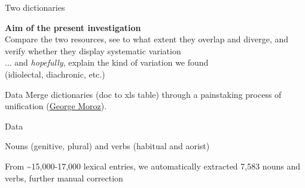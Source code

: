 \begin{frame}{Two dictionaries}

\begin{center}
    \textbf{Aim of the present investigation}\\
    Compare the two resources, see to what extent they overlap and diverge, and verify whether they display systematic variation\\
    ...
    \pause
    \vfill
    and \textit{hopefully}, explain the kind of variation we found\\ (idiolectal, diachronic, etc.) 
    
\end{center}

\end{frame}

\begin{frame}{Data}
Merge dictionaries (doc to xls table) through a painstaking process of unification (\href{https://github.com/agricolamz/}{George Moroz}).

\begin{figure}[h]
\centering
{}
\end{figure}
\end{frame}

\begin{frame}{Data}

Nouns (genitive, plural) and verbs (habitual and aorist)

\begin{figure}[h]
\centering
{}
\end{figure}

\pause
From \textasciitilde{}15,000-17,000 lexical entries, we automatically extracted 7,583 nouns and verbs, further manual correction

\end{frame}



